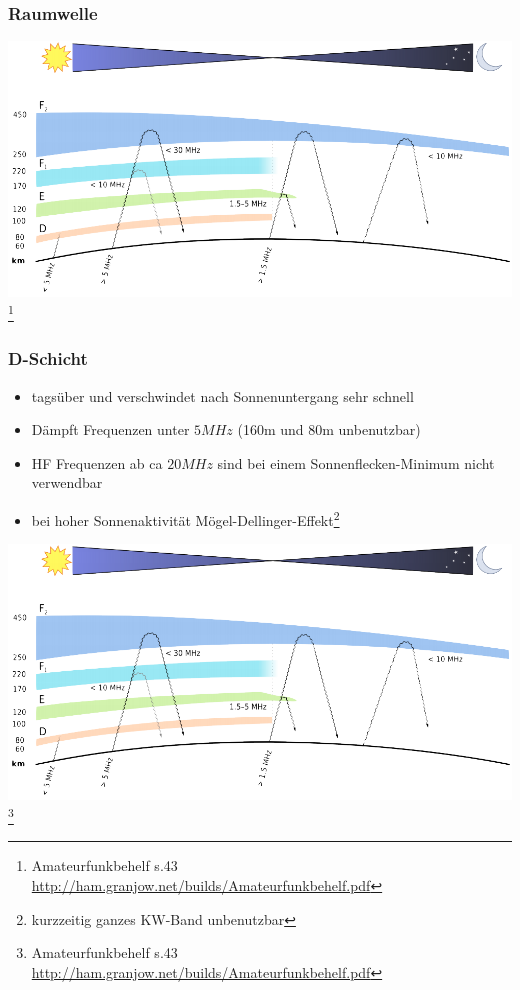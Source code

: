 \begin{frame}
  \frametitle{Raumwelle}
  \begin{center}
    \includegraphics[width=.9\textwidth,height=.85\textheight,keepaspectratio]{a08/schichten_behelf_43.png}
    \footnote{\tiny Amateurfunkbehelf s.43 \url{http://ham.granjow.net/builds/Amateurfunkbehelf.pdf}}
  \end{center}
\end{frame}

\begin{frame}
  \frametitle{D-Schicht}
  \begin{itemize}
    \item tagsüber und verschwindet nach Sonnenuntergang sehr schnell
    \item Dämpft Frequenzen unter $5MHz$ (160m und 80m unbenutzbar)
    \item HF Frequenzen ab ca $20MHz$ sind bei einem Sonnenflecken-Minimum nicht verwendbar
    \item bei hoher Sonnenaktivität
      Mögel-Dellinger-Effekt\footnote{kurzzeitig ganzes KW-Band unbenutzbar}
  \end{itemize}
  \begin{center}
    \includegraphics[width=.6\textwidth,height=.5\textheight,keepaspectratio]{a08/schichten_behelf_43.png}
    \footnote{\tiny Amateurfunkbehelf s.43 \url{http://ham.granjow.net/builds/Amateurfunkbehelf.pdf}}
  \end{center}
\end{frame}

